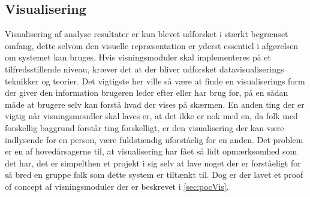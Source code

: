 \subsection{Visualisering}
Visualisering af analyse resultater er kun blevet udforsket i stærkt begrænset omfang, dette selvom den visuelle repræsentation er yderst essentiel i afgørelsen om systemet kan bruges.
Hvis visningsmoduler skal implementeres på et tilfredsstillende niveau, kræver det at der bliver udforsket datavisualiserings teknikker og teorier.
Det vigtigste her ville så være at finde en visualiserings form der giver den information brugeren leder efter eller har brug for, på en sådan måde at brugere selv kan forstå hvad der vises på skærmen.
En anden ting der er vigtig når visningsmoudler skal laves er, at det ikke er nok med en, da folk med forskellig baggrund forstår ting forskelligt, er den visualisering der kan være indlysende for en person, være fuldstændig uforståelig for en anden.
Det problem er en af hovedårsagerne til, at visualisering har fået så lidt opmærksomhed som det har, det er simpelthen et projekt i sig selv at lave noget der er forståeligt for så bred en gruppe folk som dette system er tiltænkt til.
Dog er der lavet et proof of concept af visningsmoduler der er beskrevet i \cref{sec:pocVis}.